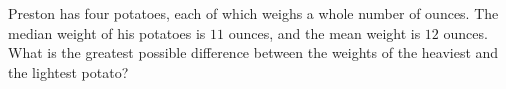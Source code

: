 Preston has four potatoes, each of which weighs a whole number of ounces. The median weight of his potatoes is $11$ ounces, and the mean weight is $12$ ounces. What is the greatest possible difference between the weights of the heaviest and the lightest potato?
